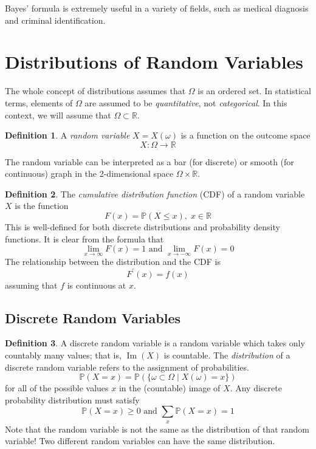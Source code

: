 \documentclass{article}
\DeclareMathOperator{\im}{Im}
\theoremstyle{remark}
\theoremstyle{definition}
\newtheorem{definition}{Definition}[section]
\begin{document}
Bayes' formula is extremely useful in a variety of fields, such as medical diagnosis and criminal identification.

\section{Distributions of Random Variables}
The whole concept of distributions assumes that $\Omega$ is an ordered set. In statistical terms, elements of $\Omega$ are assumed to be \textit{quantitative}, not \textit{categorical}. In this context, we will assume that $\Omega \subset \mathbb{R}$. 

\begin{definition}
A \textit{random variable} $X = X(\omega)$ is a function on the outcome space
\[X: \Omega \longrightarrow \mathbb{R}\]
\end{definition}

The random variable can be interpreted as a bar (for discrete) or smooth (for continuous) graph in the 2-dimensional space $\Omega \times \mathbb{R}$. 

\begin{definition}
The \textit{cumulative distribution function} (CDF) of a random variable $X$ is the function 
\[F(x) = \mathbb{P}(X \leq x), \; x \in \mathbb{R}\]
This is well-defined for both discrete distributions and probability density functions. It is clear from the formula that 
\[\lim_{x \rightarrow \infty} F(x) = 1 \text{ and } \lim_{x \rightarrow -\infty} F(x) = 0\]
The relationship between the distribution and the CDF is 
\[F^\prime (x) = f(x)\]
assuming that $f$ is continuous at $x$. 
\end{definition}

\subsection{Discrete Random Variables}
\begin{definition}
A discrete random variable is a random variable which takes only countably many values; that is, $\im(X)$ is countable. The \textit{distribution} of a discrete random variable refers to the assignment of probabilities. 
\[\mathbb{P} (X = x) = \mathbb{P}(\{\omega \subset \Omega \; | \; X (\omega) = x \})\]
for all of the possible values $x$ in the (countable) image of $X$. Any discrete probability distribution must satisfy  
\[\mathbb{P} (X = x) \geq 0 \text{ and } \sum_x \mathbb{P}(X = x) = 1\]
Note that the random variable is not the same as the distribution of that random variable! Two different random variables can have the same distribution. 
\end{definition}
\end{document}
